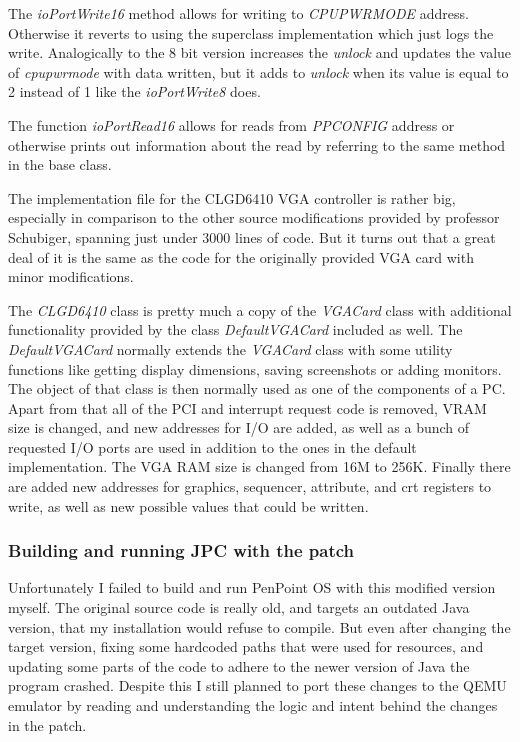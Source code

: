 The \emph{ioPortWrite16} method allows for writing to \emph{CPUPWRMODE}
address. Otherwise it reverts to using the superclass implementation which just
logs the write. Analogically to the 8 bit version increases the \emph{unlock}
and updates the value of \emph{cpupwrmode} with data written, but it adds to
\emph{unlock} when its value is equal to 2 instead of 1 like the
\emph{ioPortWrite8} does.

The function \emph{ioPortRead16} allows for reads from \emph{PPCONFIG} address
or otherwise prints out information about the read by referring to the same
method in the base class.

\begin{codeblock}
    
\end{codeblock}


The implementation file for the CLGD6410 VGA controller is rather big,
especially in comparison to the other source modifications provided by
professor Schubiger, spanning just under 3000 lines of code. But it turns out
that a great deal of it is the same as the code for the originally provided VGA
card with minor modifications.

The \emph{CLGD6410} class is pretty much a copy of the \emph{VGACard} class
with additional functionality provided by the class \emph{DefaultVGACard}
included as well. The \emph{DefaultVGACard} normally extends the \emph{VGACard}
class with some utility functions like getting display dimensions, saving
screenshots or adding monitors. The object of that class is then normally used
as one of the components of a PC. Apart from that all of the PCI and interrupt
request code is removed, VRAM size is changed, and new addresses for I/O are
added, as well as a bunch of requested I/O ports are used in addition to the
ones in the default implementation. The VGA RAM size is changed from 16M to
256K. Finally there are added new addresses for graphics, sequencer, attribute,
and crt registers to write, as well as new possible values that could be
written.

\subsubsection{Building and running JPC with the patch}

Unfortunately I failed to build and run PenPoint OS with this modified version
myself. The original source code is really old, and targets an outdated Java
version, that my installation would refuse to compile. But even after changing
the target version, fixing some hardcoded paths that were used for resources,
and updating some parts of the code to adhere to the newer version of Java the
program crashed. Despite this I still planned to port these changes to the QEMU
emulator by reading and understanding the logic and intent behind the changes
in the patch.


